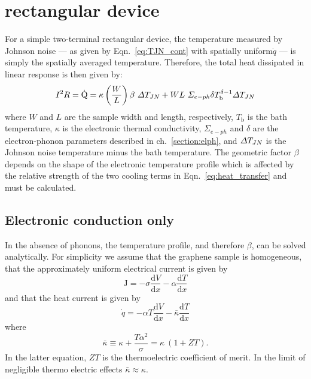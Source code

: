 \section{rectangular device}\label{section:retangularDeviceJN}
For a simple two-terminal rectangular device, the temperature measured by Johnson noise --- as given by Eqn.~\ref{eq:TJN_cont} with spatially uniform$\dot{q}$ --- is simply the spatially averaged temperature. Therefore, the total heat dissipated in linear response is then given by:
\begin{equation}\label{eq:heat_transfer}
I^2R = \dot{\mathrm{Q}} = \kappa\left(\frac{W}{L}\right)\beta~\Delta T_{JN} + WL~\Sigma_{e-ph}\delta T_\mathrm{b}^{\delta-1}\Delta T_{JN}
\end{equation}
where $W$ and $L$ are the sample width and length, respectively, $T_\mathrm{b}$ is the bath temperature, $\kappa$ is the electronic thermal conductivity, $\Sigma_{e-ph}$ and $\delta$ are the electron-phonon parameters described in ch.~\ref{section:elph}, and $\Delta T_{JN}$ is the Johnson noise temperature minus the bath temperature. The geometric factor $\beta$ depends on the shape of the electronic temperature profile which is affected by the relative strength of the two cooling terms in Eqn.~\ref{eq:heat_transfer} and must be calculated.

\subsection{Electronic conduction only}
In the absence of phonons, the temperature profile, and therefore $\beta$, can be solved analytically. For simplicity we assume that the graphene sample is homogeneous, that the approximately uniform electrical current is given by 
\begin{equation}
\mathrm{J} = -\sigma \frac{\mathrm{d}V}{\mathrm{d}x} - \alpha \frac{\mathrm{d}T}{\mathrm{d}x}
\end{equation}
and that the heat current is given by \begin{equation}
\dot{q} = -\alpha T\frac{\mathrm{d}V}{\mathrm{d}x} - \bar\kappa \frac{\mathrm{d}T}{\mathrm{d}x}
\end{equation}
where
\begin{equation}
\bar\kappa \equiv \kappa + \frac{T\alpha^2}{\sigma} = \kappa~(1+ZT).
\end{equation}
In the latter equation,  $ZT$ is the thermoelectric coefficient of merit. In the limit of negligible thermo electric effects $\bar\kappa\approx\kappa$. 

